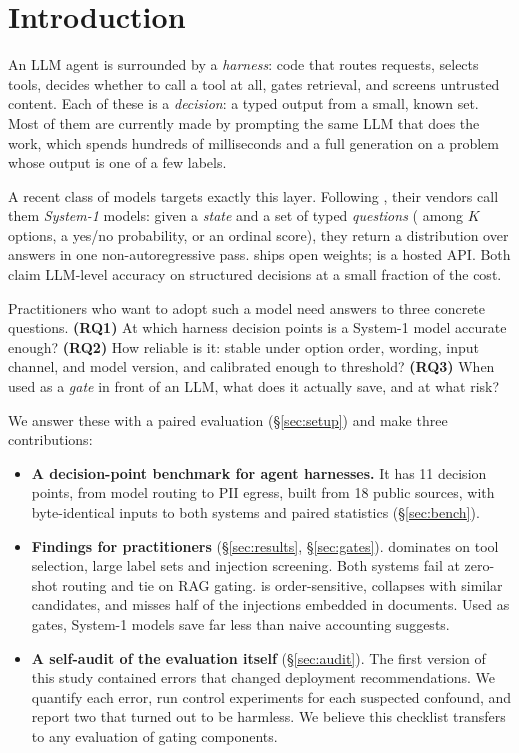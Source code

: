 \section{Introduction}
An LLM agent is surrounded by a \emph{harness}: code that routes requests, selects tools, decides whether to call a tool at all, gates retrieval, and screens untrusted content. Each of these is a \emph{decision}: a typed output from a small, known set. Most of them are currently made by prompting the same LLM that does the work, which spends hundreds of milliseconds and a full generation on a problem whose output is one of a few labels.

A recent class of models targets exactly this layer. Following \citet{kahneman2011thinking}, their vendors call them \emph{System-1} models: given a \emph{state} and a set of typed \emph{questions} ( among $K$ options, a yes/no probability, or an ordinal score), they return a distribution over answers in one non-autoregressive pass. \laya{} \citep{laya2026} ships open weights; \jev{} \citep{jev2026} is a hosted API. Both claim LLM-level accuracy on structured decisions at a small fraction of the cost.

Practitioners who want to adopt such a model need answers to three concrete questions. \textbf{(RQ1)} At which harness decision points is a System-1 model accurate enough? \textbf{(RQ2)} How reliable is it: stable under option order, wording, input channel, and model version, and calibrated enough to threshold? \textbf{(RQ3)} When used as a \emph{gate} in front of an LLM, what does it actually save, and at what risk?

We answer these with a paired evaluation (\S\ref{sec:setup}) and make three contributions:
\begin{itemize}
\item \textbf{A decision-point benchmark for agent harnesses.} It has 11 decision points, from model routing to PII egress, built from 18 public sources, with byte-identical inputs to both systems and paired statistics (\S\ref{sec:bench}).
\item \textbf{Findings for practitioners} (\S\ref{sec:results}, \S\ref{sec:gates}). \jev{} dominates on tool selection, large label sets and injection screening. Both systems fail at zero-shot routing and tie on RAG gating. \laya{} is order-sensitive, collapses with similar candidates, and misses half of the injections embedded in documents. Used as gates, System-1 models save far less than naive accounting suggests.
\item \textbf{A self-audit of the evaluation itself} (\S\ref{sec:audit}). The first version of this study contained errors that changed deployment recommendations. We quantify each error, run control experiments for each suspected confound, and report two that turned out to be harmless. We believe this checklist transfers to any evaluation of gating components.
\end{itemize}

